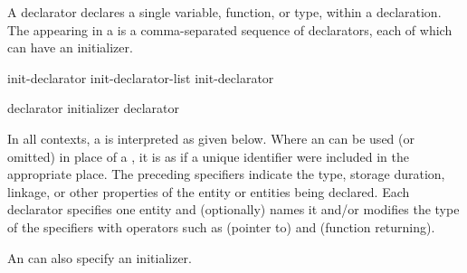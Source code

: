 \pnum
A declarator declares a single variable, function, or type, within a declaration.
The
appearing in a 
is a comma-separated sequence of declarators,
each of which can have an initializer.

\begin{bnf}
\br
    init-declarator\br
    init-declarator-list \terminal{,} init-declarator
\end{bnf}

\begin{bnf}
\br
    declarator initializer\br
    declarator  
\end{bnf}

\pnum
In all contexts, a  is interpreted as given below.
Where an  can be used (or omitted)
in place of a ,
it is as if a unique identifier were included in
the appropriate place.
The preceding specifiers indicate
the type, storage duration, linkage, or other properties
of the entity or entities being declared.
Each declarator specifies one entity and
(optionally) names it and/or
modifies the type of the specifiers with operators such as
\tcode{*} (pointer to) and \tcode{()} (function returning).
\begin{note}
An  can also specify an initializer.
\end{note}

